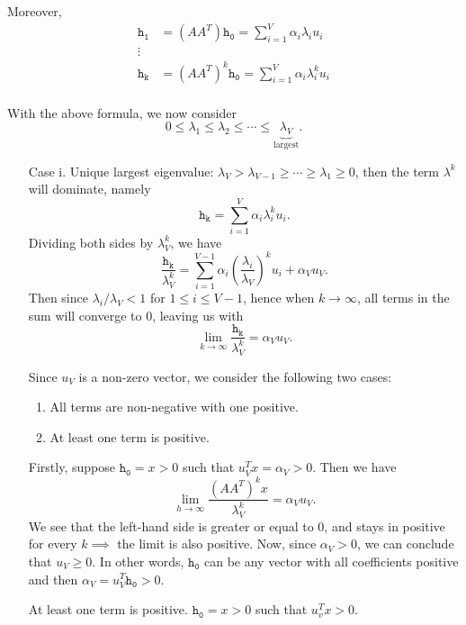 Moreover,
\[
	\begin{split}
		\mathtt{h_1} &= (A A^{T})\mathtt{h_0} = \sum\limits_{i=1}^{V} \alpha_{i} \lambda_{i}u_{i}\\
		\vdots\\
		\mathtt{h_k} &= (A A^{T})^k\mathtt{h_0} = \sum\limits_{i=1}^{V} \alpha_{i} \lambda_{i}^k u_{i}\\
	\end{split}
\]

With the above formula, we now consider
\[
	0 \leq \lambda_1 \leq \lambda_2 \leq \cdots \leq \underbrace{\lambda_V}_{\text{largest}}.
\]
\begin{enumerate}
	\item[Case i.] Unique largest eigenvalue: \(\lambda_V > \lambda_{V-1} \geq \cdots \geq \lambda_{1}\geq 0\), then the term \(\lambda^k\)
		will dominate, namely
		\[
			\mathtt{h_k} = \sum\limits_{i=1}^{V} \alpha_{i}\lambda_{i}^k u_{i}.
		\]
		Dividing both sides by \(\lambda_{V}^k\), we have
		\[
			\frac{\mathtt{h_{k}}}{\lambda_{V}^k} = \sum\limits_{i=1}^{V - 1}\alpha_{i}\left(\frac{\lambda_{i}}{\lambda_{V}}\right)^k u_{i} + \alpha_{V}u_{V}.
		\]
		Then since \(\lambda_{i}/\lambda_{V}< 1\) for \(1\leq i\leq V-1\), hence when \(k\to \infty \), all terms in the sum will converge to \(0\), leaving us with
		\[
			\lim_{k \to \infty} \frac{\mathtt{h_k}}{\lambda_V^k}= \alpha_V u_V.
		\]

		Since \(u_V\) is a non-zero vector, we consider the following two cases:
		\begin{enumerate}
			\item All terms are non-negative with one positive.
			\item At least one term is positive.
		\end{enumerate}
		Firstly, suppose \(\mathtt{h_0}= x>0\) such that \(u_{V}^{T}x = \alpha_{V} >0\). Then we have
		\[
			\lim\limits_{h \to \infty} \frac{\left(A A^{T}\right)^k x}{\lambda_{V}^k} = \alpha_{V}u_{V}.
		\]
		We see that the left-hand side is greater or equal to \(0\), and stays in positive for every \(k\implies \) the limit is also positive. Now, since \(\alpha_{V}>0\),
		we can conclude that \(u_{V}\geq 0\). In other words, \(\mathtt{h_0}\) can be any vector with all coefficients positive and then \(\alpha_{V} = u^{T}_{V}\mathtt{h_0}>0\).

		At least one term is positive. \(\mathtt{h_0} = x > 0\) such that \(u_{v}^{T}x>0\).


\end{enumerate}
